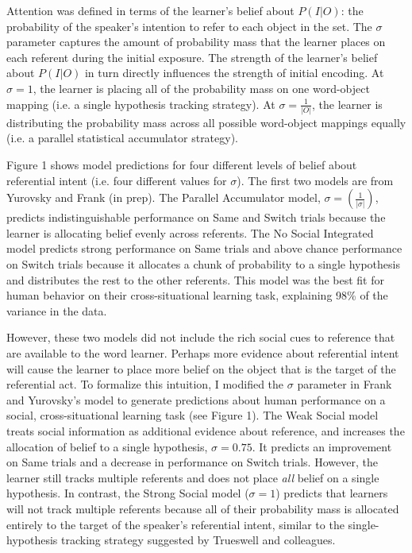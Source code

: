 \documentclass[10pt,letterpaper]{article}
\begin{document}
Attention was defined in terms of the learner's belief about $P(I|O)$: the probability of the speaker's intention to refer to each object in the set. The $\sigma$ parameter captures the amount of probability mass that the learner  places on each referent during the initial exposure. The strength of the learner's belief about $P(I|O)$ in turn directly influences the strength of initial encoding. At $\sigma = 1$, the learner is placing all of the probability mass on one word-object mapping (i.e. a single hypothesis tracking strategy). At $\sigma = \frac{1}{|O|}$, the learner is distributing the probability mass across all possible word-object mappings equally (i.e. a parallel statistical accumulator strategy). 

Figure 1 shows model predictions for four different levels of belief about referential intent (i.e. four different values for $\sigma$). The first two models are from Yurovsky and Frank (in prep). The Parallel Accumulator model, $\sigma = (\frac{1}{|\sigma|})$, predicts indistinguishable performance on Same and Switch trials because the learner is allocating belief evenly across referents. The No Social Integrated model predicts strong performance on Same trials and above chance performance on Switch trials because it allocates a chunk of probability to a single hypothesis and distributes the rest to the other referents. This model was the best fit for human behavior on their cross-situational learning task, explaining 98\% of the variance in the data. 

However, these two models did not include the rich social cues to reference that are available to the word learner. Perhaps more evidence about referential intent will cause the learner to place more belief on the object that is the target of the referential act. To formalize this intuition, I modified the $\sigma$ parameter in Frank and Yurovsky's model to generate predictions about human performance on a social, cross-situational learning task (see Figure 1). The Weak Social model treats social information as additional evidence about reference, and increases the allocation of belief to a single hypothesis, $\sigma = 0.75$. It predicts an improvement on Same trials and a decrease in performance on Switch trials. However, the learner still tracks multiple referents and does not place \emph{all} belief on a single hypothesis. In contrast, the Strong Social model ($\sigma = 1$) predicts that learners will not track multiple referents because all of their probability mass is allocated entirely to the target of the speaker's referential intent, similar to the single-hypothesis tracking strategy suggested by Trueswell and colleagues. 
\end{document}
